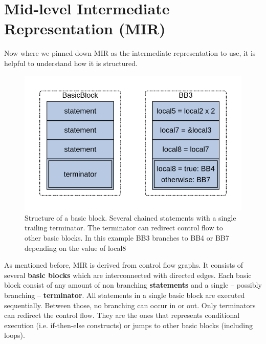 \section{Mid-level Intermediate Representation (MIR)}
\label{app_mir}

Now where we pinned down MIR as the intermediate representation to use, it is helpful to understand how it is structured.

\begin{figure}
    \centering
    \includegraphics[width=.7\textwidth]{../diagrams/BasicBlock.png}
    \caption{
        Structure of a basic block. 
        Several chained statements with a single trailing terminator.
        The terminator can redirect control flow to other basic blocks.
        In this example BB3 branches to BB4 or BB7 depending on the value of local8
        }
    \label{mir_bb}
\end{figure}

As mentioned before, MIR is derived from control flow graphs\cite[chapter 2.17]{rustc-guide}.
It consists of several \textbf{basic blocks} which are interconnected with directed edges.
Each basic block consist of any amount of non branching \textbf{statements} and a single -- possibly branching -- \textbf{terminator}.
All statements in a single basic block are executed sequentially.
Between those, no branching can occur in or out.
Only terminators can redirect the control flow.
They are the ones that represents conditional execution (i.e. if-then-else constructs) or jumps to other basic blocks (including loops).



